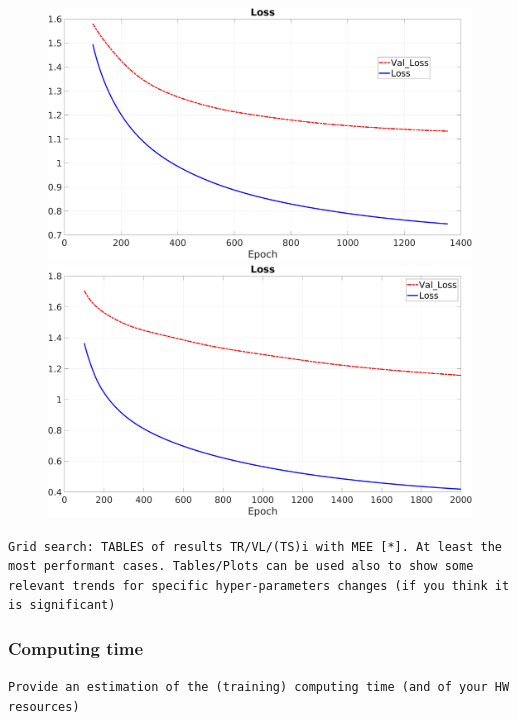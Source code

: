 \vspace{0.5cm}
\begin{figure}[H]
	\centering
	\begin{minipage}[t]{0.5\linewidth}
		\includegraphics[width=\linewidth]{img/Cup_loss_Reg_Zoom_2l.png}
	\end{minipage}%
	\begin{minipage}[t]{0.5\linewidth}
		\includegraphics[width=\linewidth]{img/Cup_loss_Reg_Zoom_5l.png}
	\end{minipage}
\end{figure}
\texttt{Grid search: TABLES of results TR/VL/(TS)i with  MEE [*]. At least the most performant cases. Tables/Plots can be used also to show some relevant trends for specific hyper-parameters changes (if you think it is significant) }
\subsubsection{Computing time}
\texttt{Provide an estimation of the (training) computing time (and of your HW resources)}

